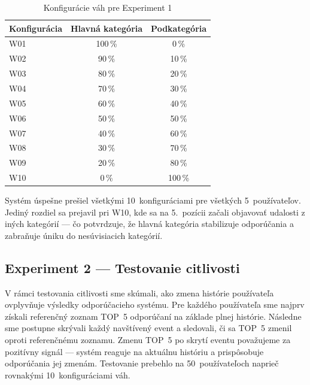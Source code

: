 \begin{table}[h]
\centering
\begin{tabular}{|l|c|c|}
\hline
\textbf{Konfigurácia} & \textbf{Hlavná kategória} & \textbf{Podkategória} \\
\hline
W01 & 100\,\% & 0\,\%   \\
W02 & 90\,\%  & 10\,\%  \\
W03 & 80\,\%  & 20\,\%  \\
W04 & 70\,\%  & 30\,\%  \\
W05 & 60\,\%  & 40\,\%  \\
W06 & 50\,\%  & 50\,\%  \\
W07 & 40\,\%  & 60\,\%  \\
W08 & 30\,\%  & 70\,\%  \\
W09 & 20\,\%  & 80\,\%  \\
W10 & 0\,\%   & 100\,\% \\
\hline
\end{tabular}
\caption{Konfigurácie váh pre Experiment 1}
\label{tab:exp1configs}
\end{table}

Systém úspešne prešiel všetkými 10~konfiguráciami pre všetkých 5~používateľov.
Jediný rozdiel sa prejavil pri W10, kde sa na 5.~pozícii začali objavovať udalosti
z iných kategórií — čo potvrdzuje, že hlavná kategória stabilizuje odporúčania a
zabraňuje úniku do nesúvisiacich kategórií.

\subsection{Experiment 2 — Testovanie citlivosti}

V rámci testovania citlivosti sme skúmali, ako zmena histórie používateľa ovplyvňuje
výsledky odporúčacieho systému. Pre každého používateľa sme najprv získali referenčný
zoznam TOP~5 odporúčaní na základe plnej histórie. Následne sme postupne skrývali
každý navštívený event a sledovali, či sa TOP~5 zmenil oproti referenčnému zoznamu.
Zmenu TOP~5 po skrytí eventu považujeme za pozitívny signál — systém reaguje na
aktuálnu históriu a prispôsobuje odporúčania jej zmenám. Testovanie prebehlo na
50~používateľoch naprieč rovnakými 10~konfiguráciami váh.

